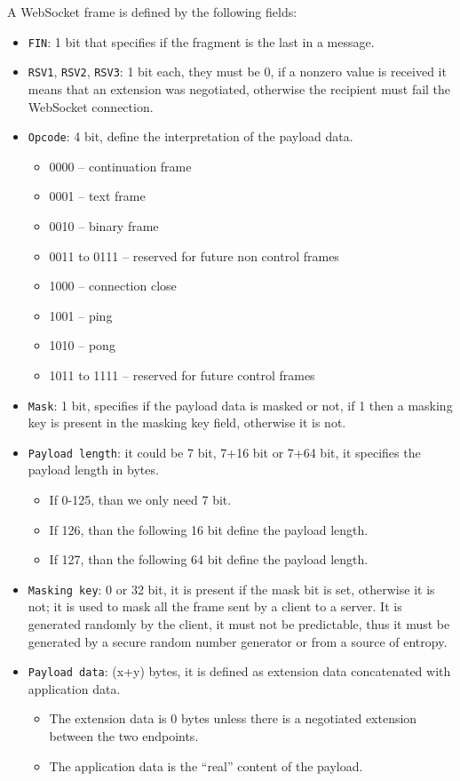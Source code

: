 A WebSocket frame is defined by the following fields:
\begin{itemize}
	\item \texttt{FIN}: 1 bit that specifies if the fragment is the last in a message.
	\item \texttt{RSV1}, \texttt{RSV2}, \texttt{RSV3}: 1 bit each, they must be 0, if a nonzero value is received it means that an extension was negotiated, otherwise the recipient must fail the WebSocket connection.
	\item \texttt{Opcode}: 4 bit, define the interpretation of the payload data.
	\begin{itemize}
		\item 0000 – continuation frame
		\item 0001 – text frame
		\item 0010 – binary frame
		\item 0011 to 0111 – reserved for future non control frames
		\item 1000 – connection close
		\item 1001 – ping
		\item 1010 – pong
		\item 1011 to 1111 – reserved for future control frames
	\end{itemize}
	\item \texttt{Mask}: 1 bit, specifies if the payload data is masked or not, if 1 then a masking key is present in the masking key field, otherwise it is not.
	\item \texttt{Payload length}: it could be 7 bit, 7+16 bit or 7+64 bit, it specifies the payload length in bytes.
	\begin{itemize}
		\item If 0-125, than we only need 7 bit.
		\item If 126, than the following 16 bit define the payload length.
		\item If 127, than the following 64 bit define the payload length.
	\end{itemize}
	\item \texttt{Masking key}: 0 or 32 bit, it is present if the mask bit is set, otherwise it is not; it is used to mask all the frame sent by a client to a server.
	It is generated randomly by the client, it must not be predictable, thus it must be generated by a secure random number generator or from a source of entropy.
	\item \texttt{Payload data}: (x+y) bytes, it is defined as extension data concatenated with application data.
	\begin{itemize}
		\item The extension data is 0 bytes unless there is a negotiated extension between the two endpoints.
		\item The application data is the “real” content of the payload.
	\end{itemize}
\end{itemize}


